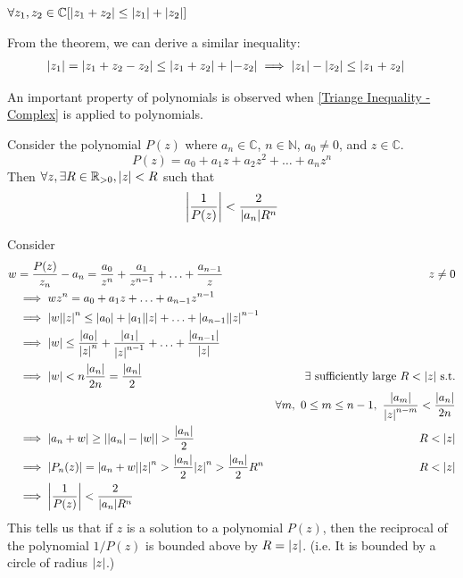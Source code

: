 \documentclass[12pt, english]{book}
\makeatletter
\renewenvironment{proof}[1][\proofname]{\par
	\pushQED{\qed}%
	\normalfont \topsep6\p@\@plus6\p@\relax
	\list{}{%
		\settowidth{\leftmargin}{\itshape\proofname:\hskip\labelsep}%
		\setlength{\labelwidth}{0pt}%
		\setlength{\itemindent}{-\leftmargin}%
		}%
	\item[\hskip\labelsep\itshape#1\@addpunct{:}]\ignorespaces
	}{\popQED\endlist\@endpefalse}
\makeatother
\begin{document}
	\begin{theorem}
		$\forall z_1, z_2 \in \mathbb{C} [\abs{z_1 + z_2} \leq \abs{z_1} + \abs{z_2}]$
		\label{Triange Inequality - Complex}
	\end{theorem}
	
	From the theorem, we can derive a similar inequality: 
	\begin{align*}
		\abs{z_1} = \abs{z_1 + z_2 - z_2} \leq \abs{z_1 + z_2} + \abs{-z_2}
		 &\implies \abs{z_1} - \abs{z_2} \leq \abs{z_1 + z_2}
	\end{align*}
	
	An important property of polynomials is observed when \cref{Triange Inequality - Complex} is applied to polynomials.
	
	\begin{corollary}
		Consider the polynomial $P(z)$ where $a_n \in \mathbb{C}$, $n \in \mathbb{N}$, $a_0 \neq 0$, and $z \in \mathbb{C}$.
		$$P(z) = a_0 + a_1 z + a_2 z^2 + \ldots + a_n z^n$$
		Then $\forall z, \exists R \in \mathbb{R}_{>0}, \abs{z} < R$ such that
		$$\abs{\frac{1}{P(z)}} < \frac{2}{\abs{a_n} R^n}$$
		\label{Complex Poly Reciprocal Bounded Corollary - Complex}
	\end{corollary}
	\begin{proof}
		Consider 
		\begin{align*}
			w &= \frac{P(z)}{z_n} - a_n = \frac{a_0}{z^n} + \frac{a_1}{z^{n-1}} + \ldots + \frac{a_{n-1}}{z} 
				& z \neq 0 \\
			&\implies wz^n = a_0 + a_1 z + \ldots + a_{n-1}z^{n-1} \\
			&\implies \abs{w}\abs{z}^n \leq \abs{a_0} + \abs{a_1}\abs{z} + \ldots + \abs{a_{n-1}}\abs{z}^{n-1} \\
			&\implies \abs{w} \leq \frac{\abs{a_0}}{\abs{z}^n} + \frac{\abs{a_1}}{\abs{z}^{n-1}} + \ldots + \frac{\abs{a_{n-1}}}{\abs{z}} 
				& \\
			&\implies \abs{w} < n\frac{\abs{a_n}}{2n} = \frac{\abs{a_n}}{2} 
				& \exists \text{ sufficiently large } R < \abs{z}  \text{ s.t.}\\
			& 	& \forall m, \ 0 \leq m \leq n-1, \ \frac{\abs{a_m}}{\abs{z}^{n-m}} < \frac{\abs{a_n}}{2n} \\
			&\implies \abs{a_n + w} \geq \abs{\abs{a_n} - \abs{w}} > \frac{\abs{a_n}}{2}
				& R < \abs{z} \\
			&\implies \abs{P_n(z)} = \abs{a_n + w} \abs{z}^n > \frac{\abs{a_n}}{2}\abs{z}^n > \frac{\abs{a_n}}{2} R^n 
				& R < \abs{z} \\
			&\implies \abs{\frac{1}{P(z)}} < \frac{2}{\abs{a_n} R^n}
		\end{align*}
	\end{proof}
	This tells us that if $z$ is a solution to a polynomial $P(z)$, then the reciprocal of the polynomial $1/P(z)$ is bounded above by $R = \abs{z}$. (i.e. It is bounded by a circle of radius $\abs{z}$.)
	
\end{document}
